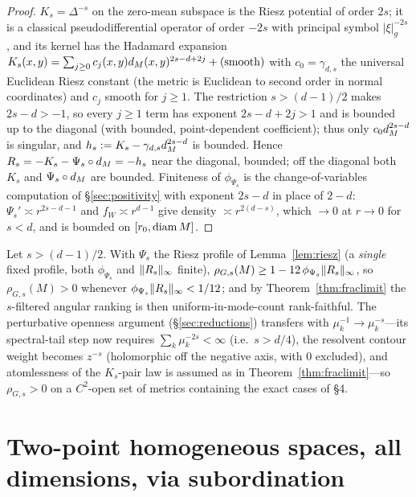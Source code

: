 \begin{proof}
$K_s=\Delta^{-s}$ on the zero-mean subspace is the Riesz potential of order $2s$; it is a
classical pseudodifferential operator of order $-2s$ with principal symbol
$\lvert\xi\rvert_g^{-2s}$, and its kernel has the Hadamard expansion
$K_s(x,y)=\sum_{j\ge0}c_j(x,y)d_M(x,y)^{2s-d+2j}+(\text{smooth})$ with $c_0=\gamma_{d,s}$ the
universal Euclidean Riesz constant (the metric is Euclidean to second order in normal
coordinates) and $c_j$ smooth for $j\ge1$. The restriction $s>(d-1)/2$ makes $2s-d>-1$, so
every $j\ge1$ term has exponent $2s-d+2j>1$ and is bounded up to the diagonal (with bounded,
point-dependent coefficient); thus only $c_0d_M^{2s-d}$ is singular, and
$h_s:=K_s-\gamma_{d,s}d_M^{2s-d}$ is bounded. Hence $R_s=-K_s-\Psi_s\circ d_M=-h_s$ near the
diagonal, bounded; off the diagonal both $K_s$ and $\Psi_s\circ d_M$ are bounded. Finiteness of
$\phi_{\Psi_s}$ is the change-of-variables computation of \S\ref{sec:positivity} with exponent
$2s-d$ in place of $2-d$: $\Psi_s'\asymp r^{2s-d-1}$ and $f_W\asymp r^{d-1}$ give density
$\asymp r^{2(d-s)}$, which $\to0$ at $r\to0$ for $s<d$, and is bounded on $[r_0,\operatorname{diam} M]$.
\end{proof}

\begin{theorem}\label{thm:fracnear}
Let $s>(d-1)/2$. With $\Psi_s$ the Riesz profile of Lemma~\ref{lem:riesz} (a \emph{single}
fixed profile, both $\phi_{\Psi_s}$ and $\lVert R_s\rVert_\infty$ finite),
$\rho_{G,s}(M)\ge1-12\,\phi_{\Psi_s}\lVert R_s\rVert_\infty$, so $\rho_{G,s}(M)>0$ whenever
$\phi_{\Psi_s}\lVert R_s\rVert_\infty<1/12$; and by Theorem~\ref{thm:fraclimit} the
$s$-filtered angular ranking is then uniform-in-mode-count rank-faithful. The perturbative
openness argument (\S\ref{sec:reductions}) transfers with $\mu_k^{-1}\to\mu_k^{-s}$---its
spectral-tail step now requires $\sum_k\mu_k^{-2s}<\infty$ (i.e.\ $s>d/4$), the resolvent
contour weight becomes $z^{-s}$ (holomorphic off the negative axis, with $0$ excluded), and
atomlessness of the $K_s$-pair law is assumed as in Theorem~\ref{thm:fraclimit}---so
$\rho_{G,s}>0$ on a $C^2$-open set of metrics containing the exact cases of \S4.
\end{theorem}

\section{Two-point homogeneous spaces, all dimensions, via subordination}

